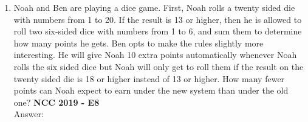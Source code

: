 \documentclass[12pt]{extarticle}
\begin{document}
\begin{enumerate}
{    \\Answer:}
    \item {Noah and Ben are playing a dice game. First, Noah rolls a twenty sided die with numbers from 1 to 20. If the result is 13 or higher, then he is allowed to roll two six-sided dice with numbers from 1 to 6, and sum them to determine how many points he gets. Ben opts to make the rules slightly more interesting. He will give Noah 10 extra points automatically whenever Noah rolls the six sided dice but Noah will only get to roll them if the result on the twenty sided die is 18 or higher instead of 13 or higher. How many fewer points can Noah expect to earn under the new system than under the old one? \textbf{NCC 2019 - E8} \\Answer: }
\end{enumerate}
\end{document}
